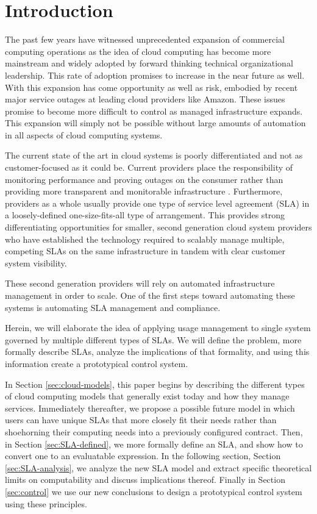 \section{Introduction}
The past few years have witnessed unprecedented expansion of commercial computing operations as the idea of cloud computing has become more mainstream and widely adopted by forward thinking technical organizational leadership.  This rate of adoption promises to increase in the near future as well.  With this expansion has come opportunity as well as risk, embodied by recent major service outages at leading cloud providers like Amazon.  These issues promise to become more difficult to control as managed infrastructure expands.  This expansion will simply not be possible without large amounts of automation in all aspects of cloud computing systems.

The current state of the art in cloud systems is poorly differentiated and not as customer-focused as it could be.  Current providers place the responsibility of monitoring performance and proving outages on the consumer rather than providing more transparent and monitorable infrastructure \cite{ctrl:amazon-cloud-watch}.  Furthermore, providers as a whole usually provide one type of service level agreement (SLA) in a loosely-defined one-size-fits-all type of arrangement.  This provides strong differentiating opportunities for smaller, second generation cloud system providers who have established the technology required to scalably manage multiple, competing SLAs on the same infrastructure in tandem with clear customer system visibility.

These second generation providers will rely on automated infrastructure management in order to scale.  One of the first steps toward automating these systems is automating SLA management and compliance.

Herein, we will elaborate the idea of applying usage management to single system governed by multiple different types of SLAs.  We will define the problem, more formally describe SLAs, analyze the implications of that formality, and using this information create a prototypical control system.

In Section \ref{sec:cloud-models}, this paper begins by describing the different types of cloud computing models that generally exist today and how they manage services.  Immediately thereafter, we propose a possible future model in which users can have unique SLAs that more closely fit their needs rather than shoehorning their computing needs into a previously configured contract.  Then, in Section \ref{sec:SLA-defined}, we more formally define an SLA, and show how to convert one to an evaluatable expression.  In the following section, Section \ref{sec:SLA-analysis}, we analyze the new SLA model and extract specific theoretical limits on computability and discuss implications thereof.  Finally in Section \ref{sec:control} we use our new conclusions to design a prototypical control system using these principles.


